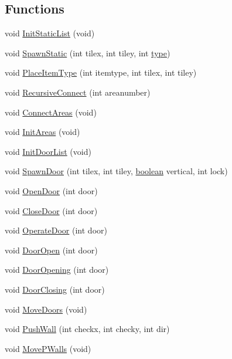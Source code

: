 \subsection*{Functions}
\begin{DoxyCompactItemize}
\item 
void \hyperlink{WL__ACT1_8C_a94a48438cf3ce2f07949db5b643a5c14}{InitStaticList} (void)
\item 
void \hyperlink{WL__ACT1_8C_ac133172594077a3babdc842789685053}{SpawnStatic} (int tilex, int tiley, int \hyperlink{WL__ACT1_8C_ac6913ebc2a188919d185cadc155a48cd}{type})
\item 
void \hyperlink{WL__ACT1_8C_ab8961c07d2e3d33e51fc815f44e47e92}{PlaceItemType} (int itemtype, int tilex, int tiley)
\item 
void \hyperlink{WL__ACT1_8C_ab91c120f7fb57742287620079e89b80f}{RecursiveConnect} (int areanumber)
\item 
void \hyperlink{WL__ACT1_8C_a853e08042a8fb9f8d92a48441c9bd86a}{ConnectAreas} (void)
\item 
void \hyperlink{WL__ACT1_8C_aac1c645485078958d366828ec6b24cad}{InitAreas} (void)
\item 
void \hyperlink{WL__ACT1_8C_a7cafaabc4f28713aed54140af4bf7821}{InitDoorList} (void)
\item 
void \hyperlink{WL__ACT1_8C_a885eeed9c39cfff1e74bcde145baf296}{SpawnDoor} (int tilex, int tiley, \hyperlink{ID__HEAD_8H_a7c6368b321bd9acd0149b030bb8275ed}{boolean} vertical, int lock)
\item 
void \hyperlink{WL__ACT1_8C_a630648edf8f675df38eb0b5b8abc6a9f}{OpenDoor} (int door)
\item 
void \hyperlink{WL__ACT1_8C_ae375a4f63040681bde68e570e88b92ae}{CloseDoor} (int door)
\item 
void \hyperlink{WL__ACT1_8C_a0169afc52fe92fa36608b9e37b56359c}{OperateDoor} (int door)
\item 
void \hyperlink{WL__ACT1_8C_aa95642b9bb56e3ff983d8ea0d25bb935}{DoorOpen} (int door)
\item 
void \hyperlink{WL__ACT1_8C_a02de8f944b6fc21749726c47929adcfe}{DoorOpening} (int door)
\item 
void \hyperlink{WL__ACT1_8C_a4b20a2c190ff470c5151e1bf5ccc7991}{DoorClosing} (int door)
\item 
void \hyperlink{WL__ACT1_8C_a1dc87c7ff6adc5fc586c9abe07ddf5c8}{MoveDoors} (void)
\item 
void \hyperlink{WL__ACT1_8C_abb884a307f2d10f6e1fc390ae66157bc}{PushWall} (int checkx, int checky, int dir)
\item 
void \hyperlink{WL__ACT1_8C_ab2085ab9cc836de93ca4c35fc4d0e677}{MovePWalls} (void)
\end{DoxyCompactItemize}
